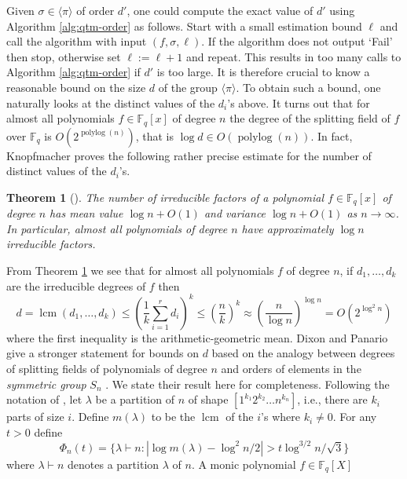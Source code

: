 \documentclass{article}
\theoremstyle{plain}
\newtheorem{theorem}{Theorem}
\theoremstyle{definition}
\newcommand{\lrang}[1]{\langle#1\rangle}
\newcommand{\abs}[1]{\left\vert#1\right\vert}
\DeclareMathOperator{\lcm}{lcm} %
\DeclareMathOperator{\polylog}{polylog}
\def\F{\ensuremath{\mathbb{F}}}
\begin{document}
Given $\sigma \in \lrang{\pi}$ of order $d'$, one could compute the exact value of $d'$ using 
Algorithm \ref{alg:qtm-order} as follows. Start with a small estimation bound $\ell$ and call the 
algorithm with input $(f, \sigma, \ell)$. If the algorithm does not output `Fail' then stop, 
otherwise set $\ell := \ell + 1$ and repeat. This results in too many calls to Algorithm 
\ref{alg:qtm-order} if $d'$ is too large. It is therefore crucial to know a reasonable bound on the 
size $d$ of the group $\lrang{\pi}$. To obtain such a bound, one naturally looks at the distinct 
values of the $d_i$'s above. It turns out that for almost all polynomials $f \in \F_q[x]$ of degree 
$n$ the degree of the splitting field of $f$ over $\F_q$ is $O(2^{\polylog(n)})$, that is $\log d 
\in O(\polylog(n))$. In fact, Knopfmacher proves the following rather precise estimate for the 
number of distinct values of the $d_i$'s.
\begin{theorem}[\cite{knopfmacher1999degrees}]
	\label{thm:d-mean}
	The number of irreducible factors of a polynomial $f \in \F_q[x]$ of degree $n$ has mean value 
	$\log n + O(1)$ and variance $\log n + O(1)$ as $n \rightarrow \infty$. In particular, almost 
	all polynomials of degree $n$ have approximately $\log n$ irreducible factors.
\end{theorem}
From Theorem \ref{thm:d-mean} we see that for almost all polynomials $f$ of degree $n$, if $d_1, 
\dots, d_k$ are the irreducible degrees of $f$ then 
\begin{equation}
	\label{equ:ag-mean}
	d = \lcm(d_1, \dots, d_k) \le \left( \frac{1}{k} \sum_{i = 1}^rd_i \right)^k \le \left( 
	\frac{n}{k} \right)^k \approx \left( \frac{n}{\log n} \right)^{\log n} = O(2^{\log^2n})
\end{equation}
where the first inequality is the arithmetic-geometric mean. Dixon and Panario 
\cite{dixon2004degree} give a stronger statement for bounds on $d$ based on the analogy between 
degrees of splitting fields of polynomials of degree $n$ and orders of elements in the 
\textit{symmetric group} $S_n$ \cite{erdos1965some, erdos1967some}. We state their result here 
for completeness. Following the notation of \cite{dixon2004degree}, let $\lambda$ be a partition of 
$n$ of shape $[1^{k_1} 2^{k_2} \dots n^{k_n}]$, i.e., there are $k_i$ parts of size $i$. Define 
$m(\lambda)$ to be the $\lcm$ of the $i$'s where $k_i \ne 0$. For any $t > 0$ define 
\[ \Phi_n(t) = \{ \lambda \vdash n : \abs{\log m(\lambda) - \log^2n / 2} > t\log^{3/2}n / \sqrt{3} 
\} \]
where $\lambda \vdash n$ denotes a partition $\lambda$ of $n$. A monic polynomial $f \in \F_q[X]$ 
\end{document}
